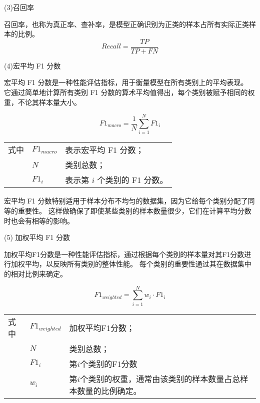 (3)召回率\par
召回率，也称为真正率、查补率，是模型正确识别为正类的样本占所有实际正类样本的比例。
\begin{equation}
	\label{eq:val_score3}
	Recall = \frac{TP}{TP + FN}
\end{equation}

(4)宏平均 F1 分数\par
宏平均 F1 分数是一种性能评估指标，用于衡量模型在所有类别上的平均表现。
它通过简单地计算所有类别 F1 分数的算术平均值得出，每个类别被赋予相同的权重，不论其样本量大小。

\begin{equation}
	\label{eq:val_score4}
	F1_{macro} = \frac{1}{N} \sum\limits_{i=1}^{N} F1_i
\end{equation}
\begin{flushleft}
	\renewcommand\arraystretch{1.25}
	\begin{tabularx}{\textwidth}{@{}>{\normalsize\rm}l@{\quad}>{\normalsize\rm}l@{——}>{\normalsize\rm}X@{}}
		式中 & $F1_{macro}$ & 表示宏平均 F1 分数；          \\
		     & $N$          & 类别总数；                    \\
		     & $F1_i$       & 表示第 $i$ 个类别的 F1 分数。 \\
	\end{tabularx}\vspace{.5ex}
\end{flushleft}

宏平均 F1 分数特别适用于样本分布不均匀的数据集，因为它给每个类别分配了同等的重要性。
这样做确保了即使某些类别的样本数量很少，它们在计算平均分数时也会有相等的影响。

(5) 加权平均 F1 分数\par
加权平均F1分数是一种性能评估指标，通过根据每个类别的样本量对其F1分数进行加权平均，以反映所有类别的整体性能。
每个类别的重要性通过其在数据集中的相对比例来确定。

\begin{equation}
	\label{eq:val_score5}
	F1_{weighted} = \sum\limits_{i=1}^{N} w_i \cdot F1_i
\end{equation}
\begin{flushleft}
	\renewcommand\arraystretch{1.25}
	\begin{tabularx}{\textwidth}{@{}>{\normalsize\rm}l@{\quad}>{\normalsize\rm}l@{——}>{\normalsize\rm}X@{}}
		式中 & $F1_{weighted}$ & 加权平均F1分数；                                                  \\
		     & $N$             & 类别总数；                                                        \\
		     & $F1_i$          & 第$i$个类别的F1分数                                               \\
		     & $w_i$           & 第$i$个类别的权重，通常由该类别的样本数量占总样本数量的比例确定。 \\
	\end{tabularx}\vspace{.5ex}
\end{flushleft}

